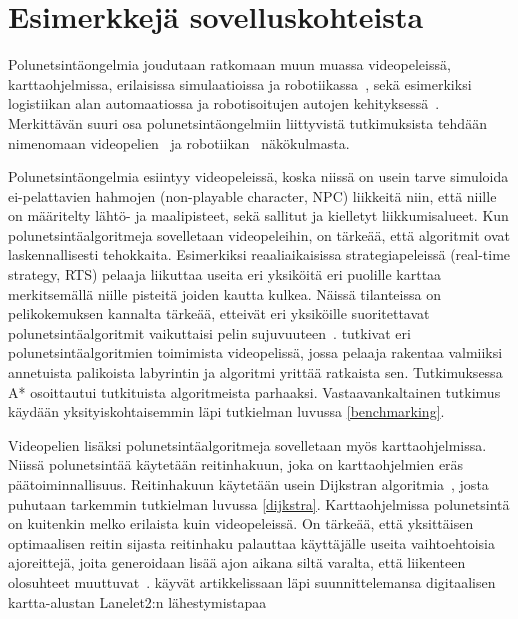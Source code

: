 \section{Esimerkkejä sovelluskohteista}\label{eSuovelluskohteista}
Polunetsintäongelmia joudutaan ratkomaan muun muassa videopeleissä, 
karttaoh\-jelmissa, erilaisissa simulaatioissa ja 
robotiikassa~\cite{ACMHindawi}, sekä esimerkiksi logistiikan alan 
automaatiossa ja robotisoitujen autojen kehityksessä~\cite{arXivMAPF}. 
Merkittävän suuri osa po\-lun\-etsintäongelmiin liittyvistä tutkimuksista tehdään 
nimenomaan 
videopelien~\cite{MathewAndMalathy}\cite{ACMHindawi}\cite{mazeGameTrilogi}
ja robotiikan~\cite{ACMHindawi}\cite{DelaunayVoronoiAStar} näkökulmasta.\par
	Polunetsintäongelmia esiintyy videopeleissä, koska niissä on usein 
tarve simuloida ei-pelattavien hahmojen (non-playable character, NPC) 
liikkeitä niin, että niille on määritelty lähtö- ja maalipisteet, sekä 
sallitut ja kielletyt liikkumisalueet. Kun polunetsintäalgoritmeja 
sovelletaan videopeleihin, on tärkeää, että algoritmit ovat laskennallisesti 
tehokkaita. Esimerkiksi reaaliaikaisissa strategiapeleissä 
(real-time strategy, RTS) pelaaja liikuttaa useita eri yksiköitä eri puolille 
karttaa merkitsemällä niille pisteitä joiden kautta kulkea. Näissä 
tilanteissa on pelikokemuksen kannalta tärkeää, etteivät eri yksiköille 
suoritettavat polunetsintäalgoritmit vaikuttaisi pelin 
sujuvuuteen~\cite{MathewAndMalathy}. \textcite{mazeGameTrilogi} tutkivat 
eri polunetsintäalgoritmien toimimista videopelissä, jossa pelaaja rakentaa 
valmiiksi annetuista palikoista labyrintin ja algoritmi yrittää ratkaista 
sen. Tutkimuksessa A* osoittautui tutkituista algoritmeista parhaaksi. 
Vastaavankaltainen tutkimus käydään yksityiskohtaisemmin läpi tutkielman 
luvussa \ref{benchmarking}. \par
	Videopelien lisäksi polunetsintäalgoritmeja sovelletaan myös 
karttaohjelmissa. Niissä polunetsintää käytetään reitinhakuun, joka on 
karttaohjelmien eräs päätoiminnallisuus. Reitinhakuun käytetään usein 
Dijkstran algoritmia~\cite{IOPDijkstra}, josta puhutaan tarkemmin tutkielman 
luvussa \ref{dijkstra}. Karttaohjelmissa polunetsintä on kuitenkin melko 
erilaista kuin videopeleissä. On tärkeää, että yksittäisen optimaalisen reitin 
sijasta reitinhaku palauttaa käyttäjälle useita vaihtoehtoisia ajoreittejä, 
joita generoidaan lisää ajon aikana siltä varalta, että liikenteen olosuhteet 
muuttuvat~\cite{Lanelet2}. \textcite{Lanelet2} käyvät artikkelissaan läpi 
suunnittelemansa digitaalisen kartta-alustan Lanelet2:n lähestymistapaa 
